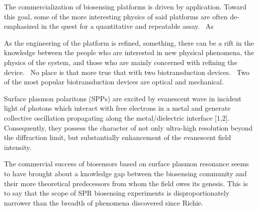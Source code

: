 The commercialization of biosensing platforms is driven by application.
Toward this goal, some of the more interesting physics of said platforms
are often de-emphasized in the quest for a quantitative and repeatable
assay.  As 

As the engineering of the platform is refined, something, there can be a
rift in the knowledge between the people who are interested in new physical
phenomena, the physics of the system, and those who are mainly concerned
with refining the device.  No place is that more true that with two
biotransduction devices.  Two of the most popular biotransduction devices
are optical and mechanical.

Surface plasmon polaritons (SPPs) are excited by evanescent wave in
incident light of photons which interact with free electrons in a metal and
generate collective oscillation propagating along the metal/dielectric
interface [1,2]. Consequently, they possess the character of not only
ultra-high resolution beyond the diffraction limit, but substantially
enhancement of the evanescent field intensity. 

The commercial success of biosensors based on surface plasmon resonance
seems to have brought about a knowledge gap between the biosensing
community and their more theoretical predecessors from whom the field owes
its genesis. This is to say that the scope of SPR biosensing experiments is
disproportionately narrower than the breadth of phenomena discovered since
Richie. 

